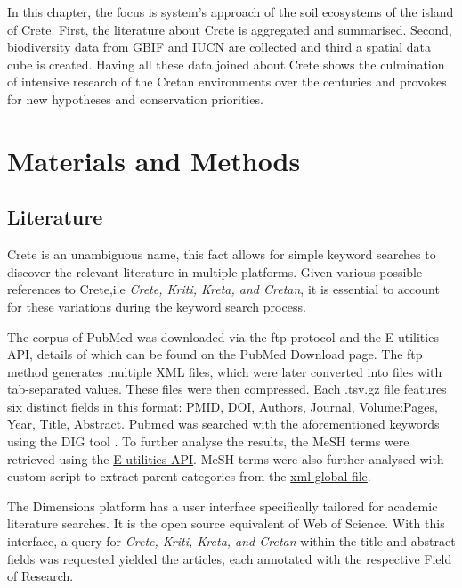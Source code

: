 In this chapter, the focus is system's approach of the soil ecosystems of the island of Crete.
First, the literature about Crete is aggregated and summarised. Second, biodiversity data
from GBIF and IUCN \parencite{iucn2024} are collected and third a spatial data cube is created. 
Having all these data joined about Crete shows the culmination of intensive 
research of the Cretan environments over the centuries and provokes for new
hypotheses and conservation priorities.


\section{Materials and Methods}\label{integration_methods}

\subsection{Literature}\label{crete-literature}

Crete is an unambiguous name, this fact allows for simple keyword searches to discover 
the relevant literature in multiple platforms. Given various possible references to Crete,i.e \textit{Crete, Kriti, Kreta, and Cretan},
it is essential to account for these variations during the keyword search process.

The corpus of PubMed was downloaded via the ftp protocol and the E-utilities API, details of which can be found on the PubMed Download page.
The ftp method generates multiple XML files, which were later converted into
files with tab-separated values. These files were then compressed. Each .tsv.gz file
features six distinct fields in this format: PMID, DOI, Authors, Journal, Volume:Pages, Year, Title, Abstract.
Pubmed was searched with the aforementioned keywords using the DIG tool \parencite{fanini2021coupling}. To further 
analyse the results, the MeSH terms were retrieved using the \href{https://www.ncbi.nlm.nih.gov/books/NBK25497/}{E-utilities API}.
MeSH terms were also further analysed with custom script to extract 
parent categories from the \href{https://www.nlm.nih.gov/databases/download/mesh.html}{xml global file}.

The Dimensions platform has a user interface specifically tailored for academic literature searches.
It is the open source equivalent of Web of Science.
With this interface, a query for \textit{Crete, Kriti, Kreta, and Cretan} within
the title and abstract fields was requested yielded the articles, each annotated with the respective Field of Research.

